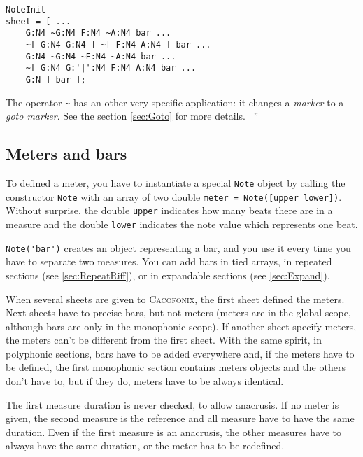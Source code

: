 \documentclass{article}
\newcommand{\cacofonix}{\textsc{Cacofonix}\xspace}
\newcommand{\note}{\lstinline!Note!\xspace}
\newenvironment{meenv}{ \par \noindent \makebox[6em][r]{ \textcolor{mecolor}{Me}: `` --~}}{~''}
\begin{document}
\begin{lstlisting}
NoteInit
sheet = [ ...
	G:N4 ~G:N4 F:N4 ~A:N4 bar ...
	~[ G:N4 G:N4 ] ~[ F:N4 A:N4 ] bar ...
	G:N4 ~G:N4 ~F:N4 ~A:N4 bar ...
	~[ G:N4 G:'|':N4 F:N4 A:N4 bar ...
	G:N ] bar ];
\end{lstlisting}

\begin{meenv}%
The operator \lstinline!~! has an other very specific application: it changes a \emph{marker} to a \emph{goto marker}. See the section \ref{sec:Goto} for more details.%
\end{meenv}

\subsection{Meters and bars}
\label{sec:MetersAndBars}

To defined a meter, you have to instantiate a special \note object by calling the constructor \note with an array of two double \lstinline!meter = Note([upper lower])!. Without surprise, the double \lstinline!upper! indicates how many beats there are in a measure and the double \lstinline!lower! indicates the note value which represents one beat.

\lstinline!Note('bar')! creates an object representing a bar, and you use it every time you have to separate two measures. You can add bars in tied arrays, in repeated sections (see \ref{sec:RepeatRiff}), or in expandable sections (see \ref{sec:Expand}).

When several sheets are given to \cacofonix, the first sheet defined the meters. Next sheets have to precise bars, but not meters (meters are in the global scope, although bars are only in the monophonic scope). If another sheet specify meters, the meters can't be different from the first sheet. With the same spirit, in polyphonic sections, bars have to be added everywhere and, if the meters have to be defined, the first monophonic section contains meters objects and the others don't have to, but if they do, meters have to be always identical.

The first measure duration is never checked, to allow anacrusis. If no meter is given, the second measure is the reference and all measure have to have the same duration. Even if the first measure is an anacrusis, the other measures have to always have the same duration, or the meter has to be redefined.

\end{document}
